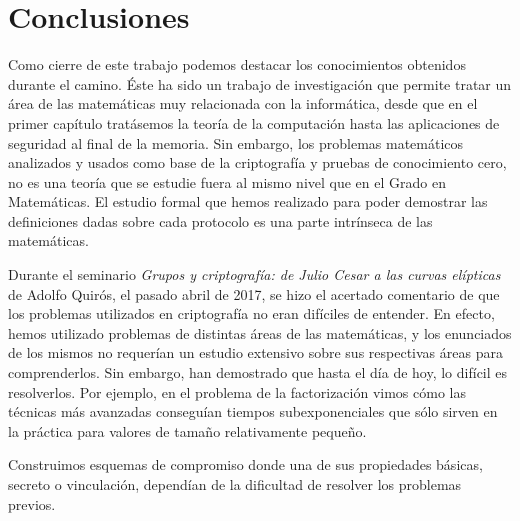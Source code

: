 










\clearpage

\section*{Conclusiones}

Como cierre de este trabajo podemos destacar los conocimientos obtenidos durante el camino. Éste ha sido un trabajo de investigación que permite tratar un área de las matemáticas muy relacionada con la informática, desde que en el primer capítulo tratásemos la teoría de la computación hasta las aplicaciones de seguridad al final de la memoria. Sin embargo, los problemas matemáticos analizados y usados como base de la criptografía y pruebas de conocimiento cero, no es una teoría que se estudie fuera al mismo nivel que en el Grado en Matemáticas. El estudio formal que hemos realizado para poder demostrar las definiciones dadas sobre cada protocolo es una parte intrínseca de las matemáticas.
 
 
Durante el seminario \textit{Grupos y criptograf\'ia: de Julio Cesar a las curvas el\'ipticas} de Adolfo Quirós, el pasado abril de 2017, se hizo el acertado comentario de que los problemas utilizados en criptografía no eran difíciles de entender. En efecto, hemos utilizado problemas de distintas áreas de las matemáticas, y los enunciados de los mismos no requerían un estudio extensivo sobre sus respectivas áreas para comprenderlos. Sin embargo, han demostrado que hasta el día de hoy, lo difícil es resolverlos. Por ejemplo, en el problema de la factorización vimos cómo las técnicas más avanzadas conseguían tiempos subexponenciales que sólo sirven en la práctica para valores de tamaño relativamente pequeño.

Construimos esquemas de compromiso donde una de sus propiedades básicas, secreto o vinculación, dependían de la dificultad de resolver los problemas previos.

